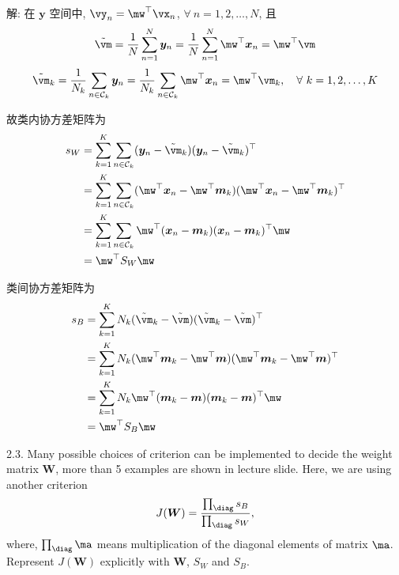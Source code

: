 \documentclass[openany]{ctexbook}
\theoremstyle{kaiti}
\theoremstyle{normal}
\begin{document}
解: 在 $\bm{y}$ 空间中, $\vy_n=\mw^{\top}\vx_n$, $\forall~n=1,2,\dots,N$, 且
\begin{equation}
  \tilde{\vm}
  =\frac{1}{N}\sum_{n=1}^{N}\bm{y}_{n}
  =\frac{1}{N}\sum_{n=1}^{N}\mw^{\top}\bm{x}_{n}
  =\mw^{\top}\vm
\end{equation}
\begin{equation}
    \tilde{\vm}_k
    =\frac{1}{N_{k}}\sum_{n\in \mathcal{C}_{k}}\bm{y}_{n}
    =\frac{1}{N_{k}}\sum_{n\in \mathcal{C}_{k}}\mw^{\top}\bm{x}_{n}
    =\mw^{\top}\vm_k,\quad\forall~k=1,2,\dots,K
\end{equation}

故类内协方差矩阵为
\begin{equation}
  \begin{aligned}
    s_W
    &=\sum_{k=1}^{K}\sum_{n\in \mathcal{C}_{k}}(\bm{y}_{n}-\tilde{\vm}_k)(\bm{y}_{n}-\tilde{\vm}_k)^{\top}\\
    &=\sum_{k=1}^{K}\sum_{n\in \mathcal{C}_{k}}(\mw^{\top}\bm{x}_{n}-\mw^{\top}\bm{m}_{k})(\mw^{\top}\bm{x}_{n}-\mw^{\top}\bm{m}_{k})^{\top}\\
    &=\sum_{k=1}^{K}\sum_{n\in \mathcal{C}_{k}}\mw^{\top}(\bm{x}_{n}-\bm{m}_{k})(\bm{x}_{n}-\bm{m}_{k})^{\top}\mw\\
    &=\mw^{\top}S_W\mw\\
  \end{aligned}
\end{equation}

类间协方差矩阵为
\begin{equation}
  \begin{aligned}
    s_B
    &=\sum_{k=1}^{K}N_{k}(\tilde{\vm}_k-\tilde{\vm})(\tilde{\vm}_k-\tilde{\vm})^{\top}\\
    &=\sum_{k=1}^{K}N_{k}(\mw^{\top}\bm{m}_{k}-\mw^{\top}\bm{m})(\mw^{\top}\bm{m}_{k}-\mw^{\top}\bm{m})^{\top}\\
    &=\sum_{k=1}^{K}N_{k}\mw^{\top}(\bm{m}_{k}-\bm{m})(\bm{m}_{k}-\bm{m})^{\top}\mw\\
    &=\mw^{\top}S_B\mw\\
  \end{aligned}
\end{equation}

2.3. Many possible choices of criterion can be implemented to decide the weight matrix $\bm{W}$, more than 5 examples are shown in lecture slide. Here, we are using another criterion
\begin{equation}
  J(\bm{W})=\frac{\prod_{\diag}s_{B}}{\prod_{\diag}s_{W}},
  \label{eq:criterion}
\end{equation}
where, $\prod_{\diag}\ma$ means multiplication of the diagonal elements of matrix $\ma$. Represent $J(\bm{W})$ explicitly with $\bm{W}$, $S_{W}$ and $S_{B}$.
\end{document}

